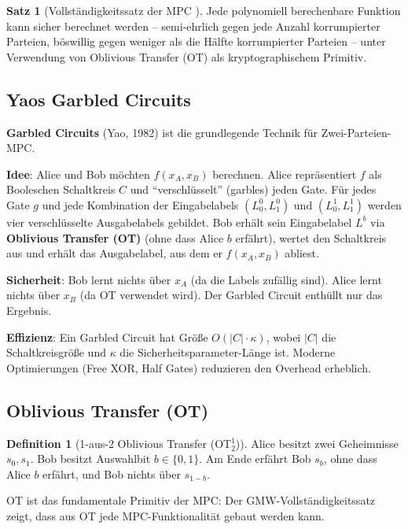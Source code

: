 ﻿\documentclass[a4paper,12pt]{scrreprt}
\theoremstyle{definition}
\newtheorem{definition}{Definition}[section]
\newtheorem{satz}{Satz}[section]
\begin{document}
\begin{satz}[Vollständigkeitssatz der MPC \cite{GMW87}]
Jede polynomiell berechenbare Funktion kann sicher berechnet werden -- semi-ehrlich gegen jede Anzahl korrumpierter Parteien, böswillig gegen weniger als die Hälfte korrumpierter Parteien -- unter Verwendung von Oblivious Transfer (OT) als kryptographischem Primitiv.
\end{satz}

\subsection{Yaos Garbled Circuits}

\textbf{Garbled Circuits} (Yao, 1982) \cite{Yao82} ist die grundlegende Technik für Zwei-Parteien-MPC.

\textbf{Idee}: Alice und Bob möchten $f(x_A, x_B)$ berechnen. Alice repräsentiert $f$ als Booleschen Schaltkreis $C$ und ``verschlüsselt'' (garbles) jeden Gate. Für jedes Gate $g$ und jede Kombination der Eingabelabels $(L_0^0, L_1^0)$ und $(L_0^1, L_1^1)$ werden vier verschlüsselte Ausgabelabels gebildet. Bob erhält sein Eingabelabel $L^b$ via \textbf{Oblivious Transfer (OT)} (ohne dass Alice $b$ erfährt), wertet den Schaltkreis aus und erhält das Ausgabelabel, aus dem er $f(x_A, x_B)$ abliest.

\textbf{Sicherheit}: Bob lernt nichts über $x_A$ (da die Labels zufällig sind). Alice lernt nichts über $x_B$ (da OT verwendet wird). Der Garbled Circuit enthüllt nur das Ergebnis.

\textbf{Effizienz}: Ein Garbled Circuit hat Größe $O(|C| \cdot \kappa)$, wobei $|C|$ die Schaltkreisgröße und $\kappa$ die Sicherheitsparameter-Länge ist. Moderne Optimierungen (Free XOR, Half Gates) reduzieren den Overhead erheblich.

\subsection{Oblivious Transfer (OT)}

\begin{definition}[1-aus-2 Oblivious Transfer (OT$^1_2$)]
Alice besitzt zwei Geheimnisse $s_0, s_1$. Bob besitzt Auswahlbit $b \in \{0,1\}$. Am Ende erfährt Bob $s_b$, ohne dass Alice $b$ erfährt, und Bob nichts über $s_{1-b}$.
\end{definition}

OT ist das fundamentale Primitiv der MPC: Der GMW-Vollständigkeitssatz \cite{GMW87} zeigt, dass aus OT jede MPC-Funktionalität gebaut werden kann.
\end{document}
